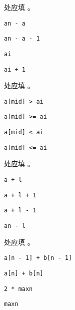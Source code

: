 \documentclass{exam-zh}
\newcommand{\code}[1]{\texttt{#1}}
\begin{document}
\begin{solution}

\end{solution}


\begin{question}
     处应填 \paren[A]。
    \begin{choices}
        \item \code{an - a}
        \item \code{an - a - 1}
        \item \code{ai}
        \item \code{ai + 1}
    \end{choices}
\end{question}




\begin{question}
     处应填 \paren[A]。
    \begin{choices}
        \item \code{a[mid] > ai}
        \item \code{a[mid] >= ai}
        \item \code{a[mid] < ai}
        \item \code{a[mid] <= ai}
    \end{choices}
\end{question}



\begin{question}
     处应填 \paren[A]。
    \begin{choices}
        \item \code{a + l}
        \item \code{a + l + 1}
        \item \code{a + l - 1}
        \item \code{an - l}
    \end{choices}
\end{question}



\begin{question}
     处应填 \paren[A]。
    \begin{choices}
        \item \code{a[n - 1] + b[n - 1]}
        \item \code{a[n] + b[n]}
        \item \code{2 * maxn}
        \item \code{maxn}
    \end{choices}
\end{question}
\end{document}
